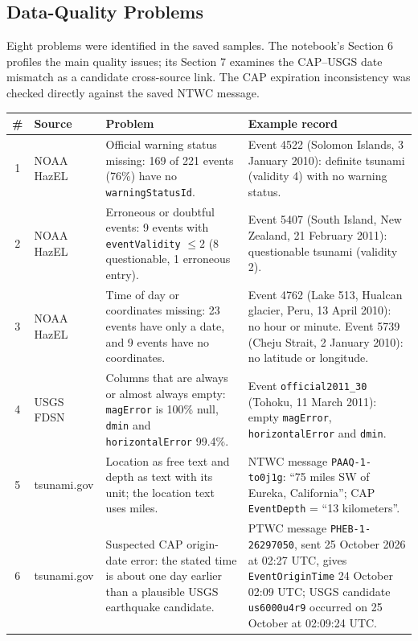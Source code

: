 \documentclass[a4paper,11pt,oneside]{book}
\begin{document}
\subsection{Data-Quality Problems}
Eight problems were identified in the saved samples. The notebook's Section 6 profiles the main quality issues; its Section 7 examines the CAP--USGS date mismatch as a candidate cross-source link. The CAP expiration inconsistency was checked directly against the saved NTWC message.

\begin{table}[H]
\centering
\small
\begin{tabularx}{\textwidth}{@{}c>{\raggedright\arraybackslash}p{2.1cm}>{\raggedright\arraybackslash}X>{\raggedright\arraybackslash}X@{}}
\toprule
\# & Source & Problem & Example record \\
\midrule
1 & NOAA HazEL & Official warning status missing: 169 of 221 events (76\%) have no \texttt{warningStatusId}. & Event 4522 (Solomon Islands, 3 January 2010): definite tsunami (validity 4) with no warning status. \\
2 & NOAA HazEL & Erroneous or doubtful events: 9 events with \texttt{eventValidity} $\leq 2$ (8 questionable, 1 erroneous entry). & Event 5407 (South Island, New Zealand, 21 February 2011): questionable tsunami (validity 2). \\
3 & NOAA HazEL & Time of day or coordinates missing: 23 events have only a date, and 9 events have no coordinates. & Event 4762 (Lake 513, Hualcan glacier, Peru, 13 April 2010): no hour or minute. Event 5739 (Cheju Strait, 2 January 2010): no latitude or longitude. \\
4 & USGS FDSN & Columns that are always or almost always empty: \texttt{magError} is 100\% null, \texttt{dmin} and \texttt{horizontalError} 99.4\%. & Event \texttt{official2011\allowbreak 0311054624120\_30} (Tohoku, 11 March 2011): empty \texttt{magError}, \texttt{horizontalError} and \texttt{dmin}. \\
5 & tsunami.gov & Location as free text and depth as text with its unit; the location text uses miles. & NTWC message \texttt{PAAQ-1-to0j1g}: ``75 miles SW of Eureka, California''; CAP \texttt{EventDepth} = ``13 kilometers''. \\
6 & tsunami.gov & Suspected CAP origin-date error: the stated time is about one day earlier than a plausible USGS earthquake candidate. & PTWC message \texttt{PHEB-1-26297050}, sent 25 October 2026 at 02:27 UTC, gives \texttt{EventOriginTime} 24 October 02:09 UTC; USGS candidate \texttt{us6000u4r9} occurred on 25 October at 02:09:24 UTC. \\

\end{tabularx}
\end{table}
\end{document}
